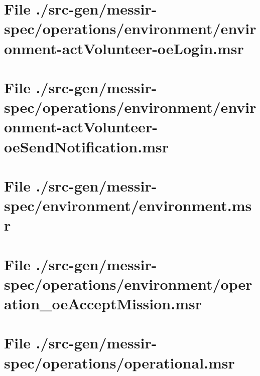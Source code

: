 \section[File /src-gen/messir-spec/operations.../environment-actVolunteer-oeLogin.msr]{File ./src-gen/messir-spec/operations/environment/environment-actVolunteer-oeLogin.msr}
\scriptsize

\normalsize
	
\section[File /src-gen/messir-spec.../environment-actVolunteer-oeSendNotification.msr]{File ./src-gen/messir-spec/operations/environment/environment-actVolunteer-oeSendNotification.msr}
\scriptsize

\normalsize
	
\section[File /src-gen/messir-spec/environment/environment.msr]{File ./src-gen/messir-spec/environment/environment.msr}
\scriptsize

\normalsize
	
\section[File /src-gen/messir-spec/operations/environment/operation_oeAcceptMission.msr]{File ./src-gen/messir-spec/operations/environment/operation_oeAcceptMission.msr}
\scriptsize

\normalsize
	
\section[File /src-gen/messir-spec/operations/operational.msr]{File ./src-gen/messir-spec/operations/operational.msr}
\scriptsize

\normalsize
	

